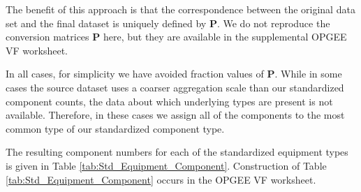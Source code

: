 \documentclass[11pt]{report}
\begin{document}
{{{{The benefit of this approach is that the correspondence between the original data set and the final dataset is uniquely defined by \textbf{P}. We do not reproduce the conversion matrices \textbf{P} here, but they are available in the supplemental OPGEE VF worksheet.

In all cases, for simplicity we have avoided fraction values of \textbf{P}. While in some cases the source dataset uses a coarser aggregation scale than our standardized component counts, the data about which underlying types are present is not available. Therefore, in these cases we assign all of the components to the most common type of our standardized component type. 

The resulting component numbers for each of the standardized equipment types is given in Table \ref{tab:Std_Equipment_Component}. Construction of Table \ref{tab:Std_Equipment_Component} occurs in the OPGEE VF worksheet.

}}}}
\end{document}
